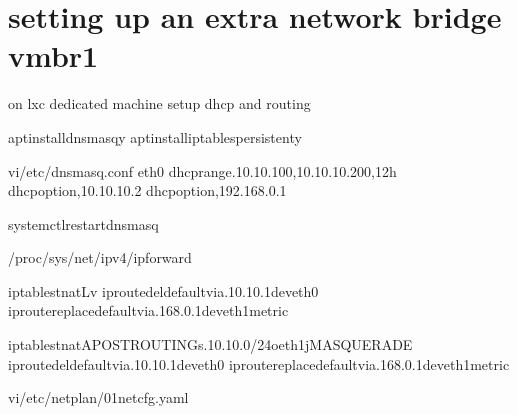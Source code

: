 \documentclass[letterpaper,10pt,english]{sphinxmanual}
\begin{document}
\section{setting up an extra network bridge vmbr1}
\label{\detokenize{cluster:setting-up-an-extra-network-bridge-vmbr1}}
\sphinxAtStartPar
on lxc dedicated machine setup dhcp and routing

\begin{sphinxVerbatim}[commandchars=\\\{\}]
aptinstalldnsmasq\PYGZhy{}y
aptinstalliptables\PYGZhy{}persistent\PYGZhy{}y

vi/etc/dnsmasq.conf
eth0
dhcp\PYGZhy{}range.10.10.100,10.10.10.200,12h
dhcp\PYGZhy{}option,10.10.10.2
dhcp\PYGZhy{}option,192.168.0.1

systemctlrestartdnsmasq

\PYGZgt{}/proc/sys/net/ipv4/ip\PYGZus{}forward

iptables\PYGZhy{}tnat\PYGZhy{}L\PYGZhy{}v
iproutedeldefaultvia.10.10.1deveth0
iproutereplacedefaultvia.168.0.1deveth1metric

iptables\PYGZhy{}tnat\PYGZhy{}APOSTROUTING\PYGZhy{}s.10.10.0/24\PYGZhy{}oeth1\PYGZhy{}jMASQUERADE
iproutedeldefaultvia.10.10.1deveth0
iproutereplacedefaultvia.168.0.1deveth1metric



vi/etc/netplan/01\PYGZhy{}netcfg.yaml
\end{sphinxVerbatim}
\end{document}
